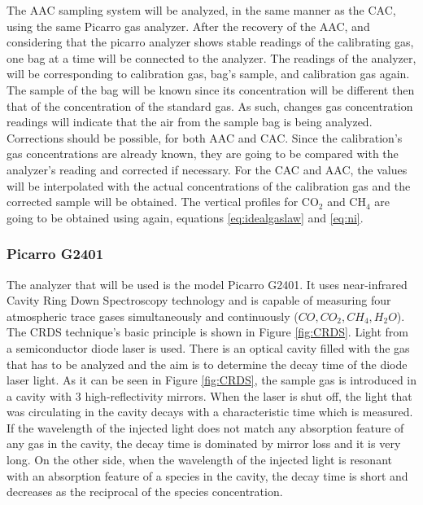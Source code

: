 The AAC sampling system will be analyzed, in the same manner as the CAC, using the same Picarro gas analyzer. After the recovery of the AAC, and considering that the picarro analyzer shows stable readings of the calibrating gas, one bag at a time will be connected to the analyzer. The readings of the analyzer, will be corresponding to calibration gas, bag's sample, and calibration gas again. The sample of the bag will be known since its concentration will be different then that of the concentration of the standard gas. As such, changes gas concentration readings will indicate that the air from the sample bag is being analyzed. Corrections should be possible, for both AAC and CAC. Since the calibration's gas concentrations are already known, they are going to be compared with the analyzer's reading and corrected if necessary. For the CAC and AAC, the values will be interpolated with the actual concentrations of the calibration gas and the corrected sample will be obtained. The vertical profiles for CO$_2$ and CH$_4$ are going to be obtained using again, equations \ref{eq:idealgaslaw} and \ref{eq:ni}. 


\subsubsection{Picarro G2401}

The analyzer that will be used is the model Picarro G2401. It uses near-infrared Cavity Ring Down Spectroscopy technology and is capable of measuring four atmospheric trace gases simultaneously and continuously ($CO, CO_2, CH_4, H_2O$).\\
The CRDS technique's basic principle is shown in Figure \ref{fig:CRDS}. Light from a semiconductor diode laser is used. There is an optical cavity filled with the gas that has to be analyzed and the aim is to determine the decay time of the diode laser light. As it can be seen in Figure \ref{fig:CRDS}, the sample gas is introduced in a cavity with 3 high-reflectivity mirrors. When the laser is shut off, the light that was circulating in the cavity decays with a characteristic time which is measured. If the wavelength of the injected light does not match any absorption feature of any gas in the cavity, the decay time is dominated by mirror loss and it is very long. On the other side, when the wavelength of the injected light is resonant with an absorption feature of a species in the cavity, the decay time is short and decreases as the reciprocal of the species concentration.




